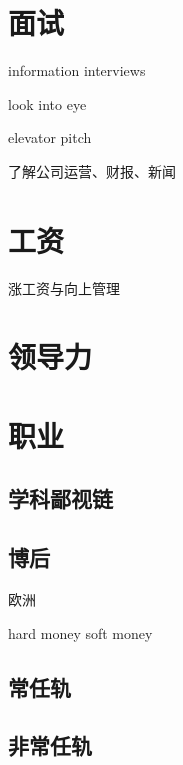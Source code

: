 \documentclass[]{tufte-book}
\begin{document}
\hypertarget{ux9762ux8bd5}{%
\section{面试}\label{ux9762ux8bd5}}

information interviews

look into eye

elevator pitch

了解公司运营、财报、新闻

\hypertarget{ux5de5ux8d44}{%
\section{工资}\label{ux5de5ux8d44}}

涨工资与向上管理

\hypertarget{ux9886ux5bfcux529b}{%
\section{领导力}\label{ux9886ux5bfcux529b}}

\hypertarget{ux804cux4e1a}{%
\section{职业}\label{ux804cux4e1a}}

\hypertarget{ux5b66ux79d1ux9119ux89c6ux94fe}{%
\subsection{学科鄙视链}\label{ux5b66ux79d1ux9119ux89c6ux94fe}}

\hypertarget{ux535aux540e}{%
\subsection{博后}\label{ux535aux540e}}

欧洲

hard money soft money

\hypertarget{ux5e38ux4efbux8f68}{%
\subsection{常任轨}\label{ux5e38ux4efbux8f68}}

\hypertarget{ux975eux5e38ux4efbux8f68}{%
\subsection{非常任轨}\label{ux975eux5e38ux4efbux8f68}}
\end{document}
